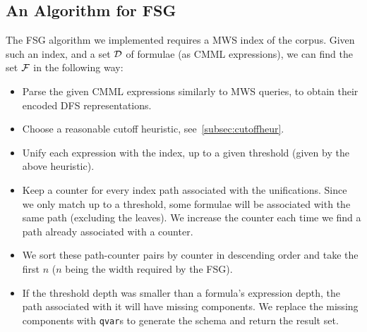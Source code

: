 \documentclass[a4paper,11pt,oneside]{article}
\def\MWS{\textsf{MWS}\xspace}
\begin{document}
\subsection{An Algorithm for FSG}\label{subsec:fsgAlgorithm}
The FSG algorithm we implemented requires a \MWS index of the corpus.
Given such an index, and a set $\mathcal{D}$ of formulae (as CMML expressions), 
we can find the set $\mathcal{F}$ in the following way:
\begin{itemize}
    \item Parse the given CMML expressions similarly to \MWS queries,
        to obtain their encoded DFS representations.
    \item Choose a reasonable cutoff heuristic, see~\ref{subsec:cutoffheur}.
    \item Unify each expression with the index, up to a given threshold (given by
        the above heuristic).
    \item Keep a counter for every index path associated with the unifications. 
        Since we only match up to a threshold, some formulae will be associated
        with the same path (excluding the leaves).
        We increase the counter each time we find a path already associated
        with a counter.
    \item We sort these path-counter pairs by counter in descending order and 
        take the first $n$ ($n$ being the width required by the FSG).
    \item If the threshold depth was smaller than a formula's expression
        depth, the path associated with it will have missing components. We
        replace the missing components with \lstinline|qvar|s to generate the
        schema and return the result set.
\end{itemize}
\end{document}

